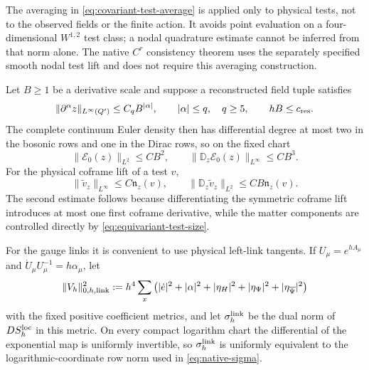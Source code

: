 \documentclass[11pt]{article}
\numberwithin{equation}{section}
\theoremstyle{definition}
\theoremstyle{remark}
\newcommand{\norm}[1]{\lVert#1\rVert}
\newcommand{\bPsi}{\overline\Psi}
\begin{document}
The averaging in \eqref{eq:covariant-test-average} is applied only to
physical tests, not to the observed fields or the finite action.
It avoids point evaluation on a four-dimensional $W^{1,2}$ test class;
a nodal quadrature estimate cannot be inferred from that norm alone.
The native $C^r$ consistency theorem uses the separately specified smooth
nodal test lift and does not require this averaging construction.

Let $B\ge1$ be a derivative scale and suppose a reconstructed field tuple
satisfies
\begin{equation}
 \norm{\partial^\alpha z}_{L^\infty(Q')}
 \le C_qB^{|\alpha|},
 \qquad |\alpha|\le q,\quad q\ge5,
 \qquad hB\le c_{\rm res}.
 \label{eq:eq-growing-band}
\end{equation}
The complete continuum Euler density then has differential degree at most two
in the bosonic rows and one in the Dirac rows, so on the fixed chart
\begin{equation}
 \norm{\mathcal E_0(z)}_{L^2}\le CB^2,
 \qquad
 \norm{\mathbb D_z\mathcal E_0(z)}_{L^\infty}\le CB^3.
 \label{eq:eq-euler-jets}
\end{equation}
For the physical coframe lift of a test $v$,
\begin{equation}
 \norm{\widetilde v_z}_{L^\infty}
 \le C\mathfrak n_z(v),
 \qquad
 \norm{\mathbb D_z\widetilde v_z}_{L^2}
 \le CB\mathfrak n_z(v).
 \label{eq:eq-test-jets}
\end{equation}
The second estimate follows because differentiating the symmetric coframe lift
introduces at most one first coframe derivative, while the matter components
are controlled directly by \eqref{eq:equivariant-test-size}.

For the gauge links it is convenient to use physical left-link tangents.  If
$U_\mu=e^{hA_\mu}$ and
$\dot U_\mu U_\mu^{-1}=h\alpha_\mu$, let
\begin{equation}
 \norm{V_h}_{0,h,{\rm link}}^2
 :=h^4\sum_x\left(
 |\dot e|^2+|\alpha|^2+|\eta_H|^2
 +|\eta_\Psi|^2+|\eta_{\bPsi}|^2\right)
 \label{eq:link-tangent-mass}
\end{equation}
with the fixed positive coefficient metrics, and let
$\sigma_h^{\rm link}$ be the dual norm of $D S_h^{\rm loc}$ in this metric.
On every compact logarithm chart the differential of the exponential map is
uniformly invertible, so $\sigma_h^{\rm link}$ is uniformly equivalent to
the logarithmic-coordinate row norm used in
\eqref{eq:native-sigma}.
\end{document}
